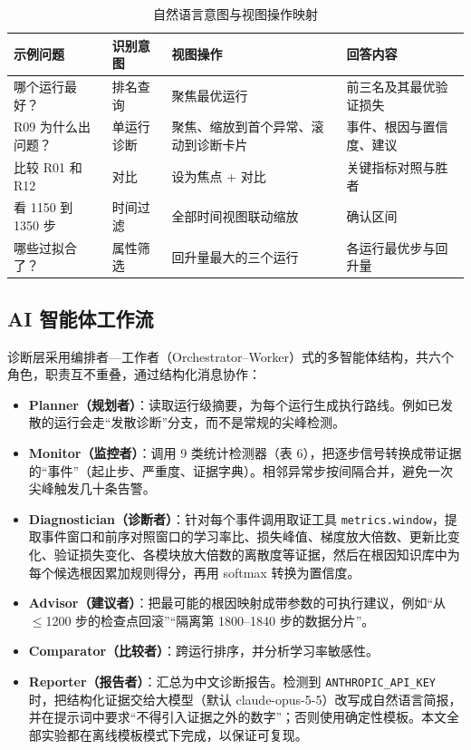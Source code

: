 \begin{table}[htbp]
\centering
\caption{自然语言意图与视图操作映射}
\small
\begin{tabularx}{\linewidth}{XXXX}
\toprule
\textbf{示例问题} & \textbf{识别意图} & \textbf{视图操作} & \textbf{回答内容} \\
\midrule
哪个运行最好？ & 排名查询 & 聚焦最优运行 & 前三名及其最优验证损失 \\
R09 为什么出问题？ & 单运行诊断 & 聚焦、缩放到首个异常、滚动到诊断卡片 & 事件、根因与置信度、建议 \\
比较 R01 和 R12 & 对比 & 设为焦点 + 对比 & 关键指标对照与胜者 \\
看 1150 到 1350 步 & 时间过滤 & 全部时间视图联动缩放 & 确认区间 \\
哪些过拟合了？ & 属性筛选 & 回升量最大的三个运行 & 各运行最优步与回升量 \\
\bottomrule
\end{tabularx}
\end{table}

\subsection{AI 智能体工作流}

诊断层采用编排者—工作者（Orchestrator–Worker）式的多智能体结构，共六个角色，职责互不重叠，通过结构化消息协作：

\begin{itemize}
\item \textbf{Planner（规划者）}：读取运行级摘要，为每个运行生成执行路线。例如已发散的运行会走“发散诊断”分支，而不是常规的尖峰检测。
\item \textbf{Monitor（监控者）}：调用 9 类统计检测器（表 6），把逐步信号转换成带证据的“事件”（起止步、严重度、证据字典）。相邻异常步按间隔合并，避免一次尖峰触发几十条告警。
\item \textbf{Diagnostician（诊断者）}：针对每个事件调用取证工具 \texttt{metrics.window}，提取事件窗口和前序对照窗口的学习率比、损失峰值、梯度放大倍数、更新比变化、验证损失变化、各模块放大倍数的离散度等证据，然后在根因知识库中为每个候选根因累加规则得分，再用 softmax 转换为置信度。
\item \textbf{Advisor（建议者）}：把最可能的根因映射成带参数的可执行建议，例如“从 $\le$1200 步的检查点回滚”“隔离第 1800–1840 步的数据分片”。
\item \textbf{Comparator（比较者）}：跨运行排序，并分析学习率敏感性。
\item \textbf{Reporter（报告者）}：汇总为中文诊断报告。检测到 \texttt{ANTHROPIC\_API\_KEY} 时，把结构化证据交给大模型（默认 claude-opus-5-5）改写成自然语言简报，并在提示词中要求“不得引入证据之外的数字”；否则使用确定性模板。本文全部实验都在离线模板模式下完成，以保证可复现。
\end{itemize}

